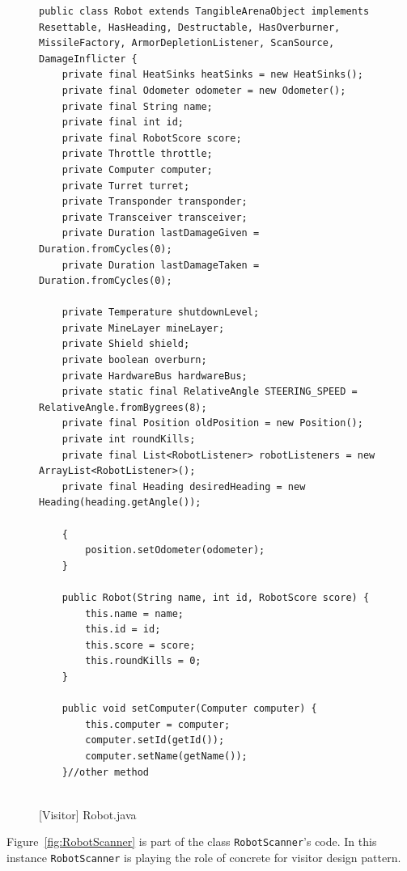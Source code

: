 \begin{figure}[htb]
\centering
\lstset{language=Java, basicstyle=\scriptsize, stepnumber=1, showspaces=false, showstringspaces=false,breaklines=true}
\begin{lstlisting}
public class Robot extends TangibleArenaObject implements Resettable, HasHeading, Destructable, HasOverburner, MissileFactory, ArmorDepletionListener, ScanSource, DamageInflicter {
    private final HeatSinks heatSinks = new HeatSinks();
    private final Odometer odometer = new Odometer();
    private final String name;
    private final int id;
    private final RobotScore score;
    private Throttle throttle;
    private Computer computer;
    private Turret turret;
    private Transponder transponder;
    private Transceiver transceiver;
    private Duration lastDamageGiven = Duration.fromCycles(0);
    private Duration lastDamageTaken = Duration.fromCycles(0);
   
    private Temperature shutdownLevel;
    private MineLayer mineLayer;
    private Shield shield;
    private boolean overburn;
    private HardwareBus hardwareBus;
    private static final RelativeAngle STEERING_SPEED = RelativeAngle.fromBygrees(8);
    private final Position oldPosition = new Position();
    private int roundKills;
    private final List<RobotListener> robotListeners = new ArrayList<RobotListener>();
    private final Heading desiredHeading = new Heading(heading.getAngle()); 
    
    {
        position.setOdometer(odometer);
    }

    public Robot(String name, int id, RobotScore score) {
        this.name = name;
        this.id = id;
        this.score = score;
        this.roundKills = 0;
    }

    public void setComputer(Computer computer) {
        this.computer = computer;
        computer.setId(getId());
        computer.setName(getName());
    }//other method


\end{lstlisting}
\caption{[Visitor] Robot.java}
\label{fig:Robot}
\end{figure}
\FloatBarrier




Figure~\ref{fig:RobotScanner} is part of the class \texttt{RobotScanner}'s code. In this instance \texttt{RobotScanner} is playing the role of concrete for visitor design pattern. 

